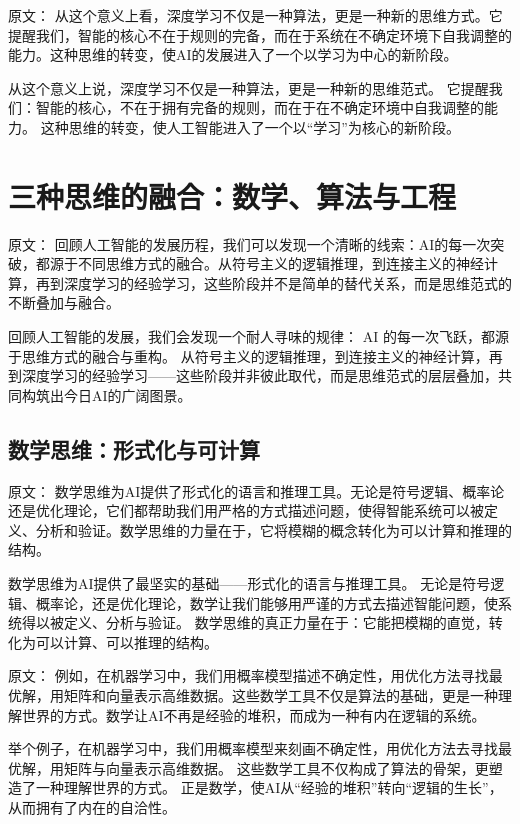原文：
从这个意义上看，深度学习不仅是一种算法，更是一种新的思维方式。它提醒我们，智能的核心不在于规则的完备，而在于系统在不确定环境下自我调整的能力。这种思维的转变，使AI的发展进入了一个以学习为中心的新阶段。

从这个意义上说，深度学习不仅是一种算法，更是一种新的思维范式。  
它提醒我们：智能的核心，不在于拥有完备的规则，而在于在不确定环境中自我调整的能力。  
这种思维的转变，使人工智能进入了一个以“学习”为核心的新阶段。

\section{三种思维的融合：数学、算法与工程}

原文：
回顾人工智能的发展历程，我们可以发现一个清晰的线索：AI的每一次突破，都源于不同思维方式的融合。从符号主义的逻辑推理，到连接主义的神经计算，再到深度学习的经验学习，这些阶段并不是简单的替代关系，而是思维范式的不断叠加与融合。

回顾人工智能的发展，我们会发现一个耐人寻味的规律：  
AI 的每一次飞跃，都源于思维方式的融合与重构。  
从符号主义的逻辑推理，到连接主义的神经计算，再到深度学习的经验学习——这些阶段并非彼此取代，而是思维范式的层层叠加，共同构筑出今日AI的广阔图景。

\subsection{数学思维：形式化与可计算}

原文：
数学思维为AI提供了形式化的语言和推理工具。无论是符号逻辑、概率论还是优化理论，它们都帮助我们用严格的方式描述问题，使得智能系统可以被定义、分析和验证。数学思维的力量在于，它将模糊的概念转化为可以计算和推理的结构。

数学思维为AI提供了最坚实的基础——形式化的语言与推理工具。  
无论是符号逻辑、概率论，还是优化理论，数学让我们能够用严谨的方式去描述智能问题，使系统得以被定义、分析与验证。  
数学思维的真正力量在于：它能把模糊的直觉，转化为可以计算、可以推理的结构。

原文：
例如，在机器学习中，我们用概率模型描述不确定性，用优化方法寻找最优解，用矩阵和向量表示高维数据。这些数学工具不仅是算法的基础，更是一种理解世界的方式。数学让AI不再是经验的堆积，而成为一种有内在逻辑的系统。

举个例子，在机器学习中，我们用概率模型来刻画不确定性，用优化方法去寻找最优解，用矩阵与向量表示高维数据。  
这些数学工具不仅构成了算法的骨架，更塑造了一种理解世界的方式。  
正是数学，使AI从“经验的堆积”转向“逻辑的生长”，从而拥有了内在的自洽性。


